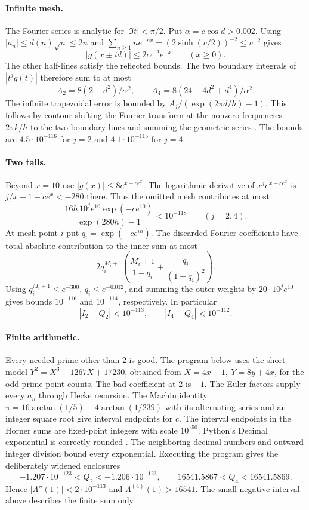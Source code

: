 \documentclass[11pt]{article}
\begin{document}
\paragraph{Infinite mesh.}
The Fourier series is analytic for \(|\Im t|<\pi/2\). Put
\(\alpha=c\cos d>0.002\). Using \(|a_n|\le d(n)\sqrt n\le2n\)
and \(\sum_{n\ge1}n e^{-nv}=(2\sinh(v/2))^{-2}\le v^{-2}\)
gives
\[
 |g(x\pm id)|\le 2\alpha^{-2} e^{-x}\qquad(x\ge0).
\]
The other half-lines satisfy the reflected bounds. The two boundary
integrals of \(|t^j g(t)|\) therefore sum to at most
\[
 A_2=8(2+d^2)/\alpha^2,\qquad A_4=8(24+4d^2+d^4)/\alpha^2 .
\]
The infinite trapezoidal error is bounded by
\(A_j/(\exp(2\pi d/h)-1)\). This follows by contour shifting the
Fourier transform at the nonzero frequencies \(2\pi k/h\) to the
two boundary lines and summing the geometric series \cite{TW}.
The bounds are \(4.5\cdot10^{-116}\) for \(j=2\) and
\(4.1\cdot10^{-115}\) for \(j=4\).

\paragraph{Two tails.}
Beyond \(x=10\) use
\(|g(x)|\le8e^{x-ce^x}\). The logarithmic derivative of
\(x^je^{x-ce^x}\) is \(j/x+1-ce^x<-280\) there. Thus the omitted
mesh contributes at most
\[
 \frac{16h\,10^j e^{10}\exp(-ce^{10})}{\exp(280h)-1}
 <10^{-118}\qquad(j=2,4).
\]
At mesh point \(i\) put \(q_i=\exp(-ce^{ih})\).
The discarded Fourier coefficients have total absolute contribution
to the inner sum at most
\[
 2q_i^{M_i+1}
 \left(\frac{M_i+1}{1-q_i}+
       \frac{q_i}{(1-q_i)^2}\right).
\]
Using \(q_i^{M_i+1}\le e^{-300}\),
\(q_i\le e^{-0.012}\), and summing the outer weights by
\(20\cdot 10^j e^{10}\) gives bounds \(10^{-116}\) and \(10^{-114}\),
respectively. In particular
\[
 |I_2-Q_2|<10^{-113},\qquad |I_4-Q_4|<10^{-112}.
\]

\paragraph{Finite arithmetic.}
Every needed prime other than 2 is good. The program below uses the
short model \(Y^2=X^3-1267X+17230\), obtained from
\(X=4x-1,\ Y=8y+4x\), for the odd-prime point counts. The bad
coefficient at 2 is \(-1\). The Euler factors supply every
\(a_n\) through Hecke recursion. The Machin identity
\(\pi=16\arctan(1/5)-4\arctan(1/239)\) with its alternating series
and an integer square root give interval endpoints for \(c\).
The interval endpoints in the Horner sums are fixed-point integers
with scale \(10^{150}\). Python's Decimal exponential is
correctly rounded \cite{decimal}. The neighboring decimal numbers
and outward integer division bound every exponential.
Executing the program gives the deliberately widened enclosures
\[
 -1.207\cdot10^{-123}<Q_2<-1.206\cdot10^{-123},
 \qquad 16541.5867<Q_4<16541.5869.
\]
Hence \(|\Lambda''(1)|<2\cdot10^{-113}\) and \(\Lambda^{(4)}(1)>16541\).
The small negative interval above describes the finite sum only.
\end{document}
